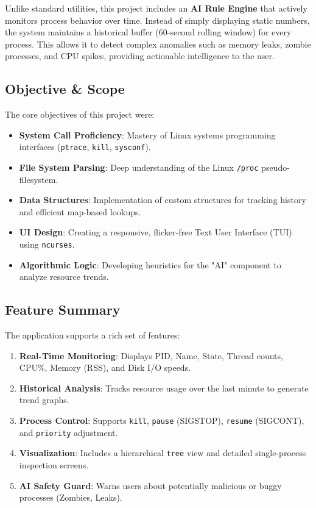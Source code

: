\documentclass[a4paper,12pt]{article}
\begin{document}
Unlike standard utilities, this project includes an \textbf{AI Rule Engine} that actively monitors process behavior over time. Instead of simply displaying static numbers, the system maintains a historical buffer (60-second rolling window) for every process. This allows it to detect complex anomalies such as memory leaks, zombie processes, and CPU spikes, providing actionable intelligence to the user.

\subsection{Objective & Scope}
The core objectives of this project were:
\begin{itemize}
    \item \textbf{System Call Proficiency}: Mastery of Linux systems programming interfaces (\texttt{ptrace}, \texttt{kill}, \texttt{sysconf}).
    \item \textbf{File System Parsing}: Deep understanding of the Linux \texttt{/proc} pseudo-filesystem.
    \item \textbf{Data Structures}: Implementation of custom structures for tracking history and efficient map-based lookups.
    \item \textbf{UI Design}: Creating a responsive, flicker-free Text User Interface (TUI) using \texttt{ncurses}.
    \item \textbf{Algorithmic Logic}: Developing heuristics for the "AI" component to analyze resource trends.
\end{itemize}

\subsection{Feature Summary}
The application supports a rich set of features:
\begin{enumerate}
    \item \textbf{Real-Time Monitoring}: Displays PID, Name, State, Thread counts, CPU\%, Memory (RSS), and Disk I/O speeds.
    \item \textbf{Historical Analysis}: Tracks resource usage over the last minute to generate trend graphs.
    \item \textbf{Process Control}: Supports \texttt{kill}, \texttt{pause} (SIGSTOP), \texttt{resume} (SIGCONT), and \texttt{priority} adjustment.
    \item \textbf{Visualization}: Includes a hierarchical \texttt{tree} view and detailed single-process inspection screens.
    \item \textbf{AI Safety Guard}: Warns users about potentially malicious or buggy processes (Zombies, Leaks).
\end{enumerate}
\end{document}
